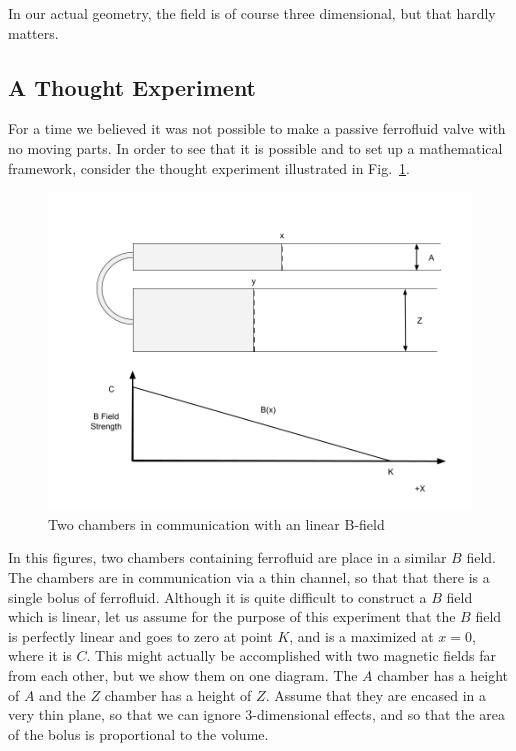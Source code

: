 \documentclass{asme2ej}
\begin{document}
In our actual geometry, the field is of course three dimensional,
but that hardly matters.

\subsection{ A Thought Experiment }

For a time we believed it was not possible to make a passive
ferrofluid valve with no moving parts.
In order to see that it is possible and to set up a mathematical
framework, consider the thought experiment illustrated in Fig.~\ref{fig:thought}.


\begin{figure}
\centerline{\includegraphics[width=6in]{figure/ThoughtExperiment.png}}
\caption{Two chambers in communication with an linear B-field}
\label{fig:thought}
\end{figure}

In this figures, two chambers containing ferrofluid are place in a similar
$B$ field. The chambers are in communication via a thin channel, so that that
there is a single bolus of ferrofluid. Although it is quite difficult to
construct a $B$ field which is linear, let us assume for the purpose of this
experiment that the $B$ field is perfectly linear and goes to zero at
point $K$, and is a maximized at $x=0$, where it is $C$. This might actually
be accomplished with two magnetic fields far from each other, but we show
them on one diagram. The $A$ chamber has a height of $A$ and the $Z$ chamber
has a height of $Z$. Assume that they are encased in a very thin plane, so
that we can ignore 3-dimensional effects, and so that the area of the bolus
is proportional to the volume.
\end{document}
